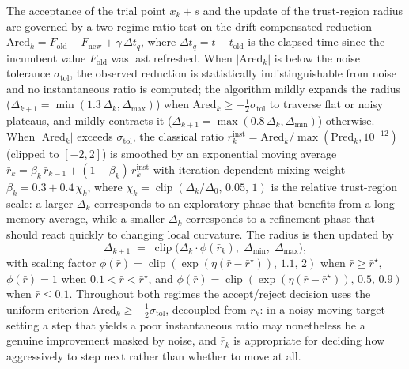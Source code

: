 \documentclass[11pt,a4paper]{article}
\begin{document}
The acceptance of the trial point $x_k + s$ and the update of the
trust-region radius are governed by a two-regime ratio test on
the drift-compensated reduction
$\mathrm{Ared}_k = F_{\mathrm{old}} - F_{\mathrm{new}}
+ \gamma\,\Delta t_q$, where
$\Delta t_q = t - t_{\mathrm{old}}$ is the elapsed time since
the incumbent value $F_{\mathrm{old}}$ was last refreshed. When
$|\mathrm{Ared}_k|$ is below the noise tolerance
$\sigma_{\mathrm{tol}}$, the observed reduction is statistically
indistinguishable from noise and no instantaneous ratio is computed;
the algorithm mildly expands the radius
($\Delta_{k+1} = \min(1.3\,\Delta_k, \Delta_{\max})$) when
$\mathrm{Ared}_k \ge -\tfrac{1}{2}\sigma_{\mathrm{tol}}$ to traverse
flat or noisy plateaus, and mildly contracts it
($\Delta_{k+1} = \max(0.8\,\Delta_k, \Delta_{\min})$) otherwise.
When $|\mathrm{Ared}_k|$ exceeds $\sigma_{\mathrm{tol}}$, the
classical ratio $r_k^{\mathrm{inst}} =
\mathrm{Ared}_k / \max(\mathrm{Pred}_k, 10^{-12})$ (clipped to
$[-2, 2]$) is smoothed by an exponential moving average
$\bar r_k = \beta_k\,\bar r_{k-1} + (1-\beta_k)\,r_k^{\mathrm{inst}}$
with iteration-dependent mixing weight
$\beta_k = 0.3 + 0.4\,\chi_k$, where
$\chi_k = \operatorname{clip}(\Delta_k/\Delta_0,\,0.05,\,1)$ is the
relative trust-region scale: a larger $\Delta_k$ corresponds to an
exploratory phase that benefits from a long-memory average, while
a smaller $\Delta_k$ corresponds to a refinement phase that should
react quickly to changing local curvature. The radius is then
updated by
\begin{equation}\label{eq:radius-update}
  \Delta_{k+1}
  \;=\;
  \operatorname{clip}\!\bigl(\Delta_k \cdot \phi(\bar r_k),\;
        \Delta_{\min},\; \Delta_{\max}\bigr),
\end{equation}
with scaling factor $\phi(\bar r) =
\operatorname{clip}(\exp(\eta(\bar r - \bar r^{\star})),\,1.1,\,2)$
when $\bar r \ge \bar r^{\star}$,
$\phi(\bar r) = 1$ when $0.1 < \bar r < \bar r^{\star}$, and
$\phi(\bar r) =
\operatorname{clip}(\exp(\eta(\bar r - \bar r^{\star})),\,0.5,\,0.9)$
when $\bar r \le 0.1$. Throughout both regimes the accept/reject
decision uses the uniform criterion
$\mathrm{Ared}_k \ge -\tfrac{1}{2}\sigma_{\mathrm{tol}}$,
decoupled from $\bar r_k$: in a noisy moving-target setting a step
that yields a poor instantaneous ratio may nonetheless be a genuine
improvement masked by noise, and $\bar r_k$ is appropriate for
deciding how aggressively to step next rather than whether to move
at all.
\end{document}
